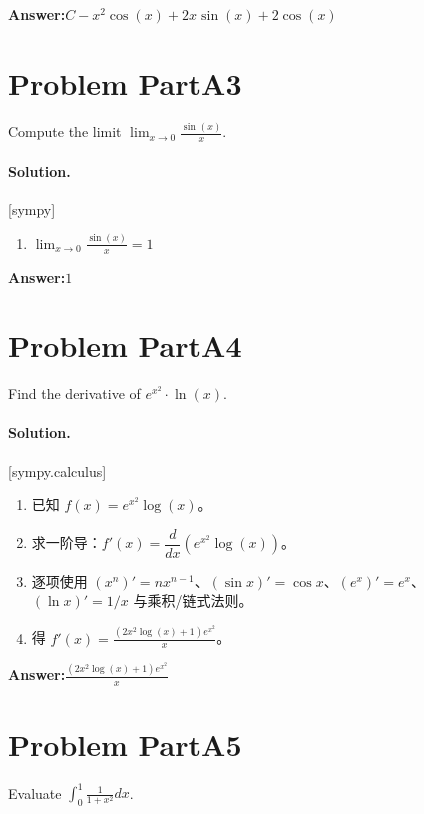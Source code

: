 \documentclass[11pt,a4paper]{ctexart}
\newcommand{\solvertag}[1]{{\footnotesize\color{gray}\textsf{[#1]}}}
\begin{document}
\noindent\textbf{Answer:}\quad $C - x^{2} \cos{\left(x \right)} + 2 x \sin{\left(x \right)} + 2 \cos{\left(x \right)}$

\medskip

\section*{Problem PartA3}
Compute the limit $\lim_{x \to 0} \frac{\sin(x)}{x}$.

\paragraph{Solution.} \solvertag{sympy} 

\begin{enumerate}[leftmargin=*]
  \item $\lim_{x \to 0} \frac{\sin{\left(x \right)}}{x} = 1$
\end{enumerate}

\noindent\textbf{Answer:}\quad $1$

\medskip

\section*{Problem PartA4}
Find the derivative of $e^{x^2} \cdot \ln(x)$.

\paragraph{Solution.} \solvertag{sympy.calculus} 

\begin{enumerate}[leftmargin=*]
  \item 已知 $f(x) = e^{x^{2}} \log{\left(x \right)}$。
  \item 求一阶导：$f'(x) = \dfrac{d}{dx}\left(e^{x^{2}} \log{\left(x \right)}\right)$。
  \item 逐项使用 $(x^n)' = nx^{n-1}$、$(\sin x)' = \cos x$、$(e^x)' = e^x$、$(\ln x)' = 1/x$ 与乘积/链式法则。
  \item 得 $f'(x) = \frac{\left(2 x^{2} \log{\left(x \right)} + 1\right) e^{x^{2}}}{x}$。
\end{enumerate}

\noindent\textbf{Answer:}\quad $\frac{\left(2 x^{2} \log{\left(x \right)} + 1\right) e^{x^{2}}}{x}$

\medskip

\section*{Problem PartA5}
Evaluate $\int_0^1 \frac{1}{1+x^2} dx$.
\end{document}
